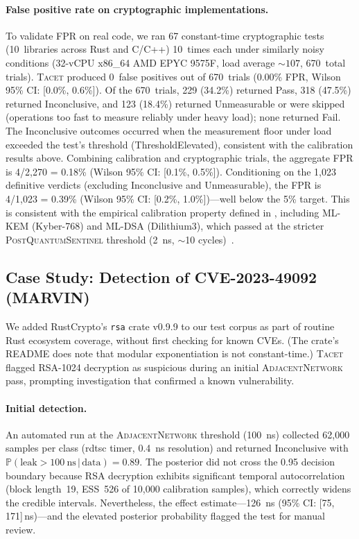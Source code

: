 \documentclass[letterpaper,twocolumn,10pt]{article}
\newcommand{\tacet}{\textsc{Tacet}\xspace}
\newcommand{\prob}[1]{\mathbb{P}(#1)}
\newcommand{\given}{\,|\,}
\newcommand{\ns}[1]{\SI{#1}{\nano\second}}
\begin{document}
\paragraph{False positive rate on cryptographic implementations.}
To validate FPR on real code, we ran 67 constant-time cryptographic tests
(10~libraries across Rust and C/C++) 10~times each under similarly noisy conditions
(32-vCPU x86\_64 AMD EPYC 9575F, load average ${\sim}107$, 670~total trials).
\tacet produced 0~false positives out of 670~trials (0.00\% FPR, Wilson 95\% CI:
[0.0\%, 0.6\%]).
Of the 670~trials, 229 (34.2\%) returned Pass, 318 (47.5\%) returned
Inconclusive, and 123 (18.4\%) returned Unmeasurable or were skipped
(operations too fast to measure reliably under heavy load); none returned Fail.
The Inconclusive outcomes occurred when the measurement floor under load exceeded
the test's threshold (ThresholdElevated), consistent with the calibration results above.
Combining calibration and cryptographic trials, the aggregate FPR is
4/2{,}270 = 0.18\% (Wilson 95\% CI: [0.1\%, 0.5\%]).
Conditioning on the 1{,}023 definitive verdicts (excluding Inconclusive and Unmeasurable),
the FPR is 4/1{,}023 = 0.39\% (Wilson 95\% CI: [0.2\%, 1.0\%])---well
below the 5\% target.
This is consistent with the empirical calibration property defined in ,
including ML-KEM (Kyber-768) and ML-DSA (Dilithium3), which passed at the stricter
\textsc{PostQuantumSentinel} threshold (\ns{2}, $\sim$10 cycles)~\cite{kyberslash}.

\subsection{Case Study: Detection of CVE-2023-49092 (MARVIN)}
\label{sec:evaluation:marvin}

We added RustCrypto's \texttt{rsa} crate v0.9.9 to our test corpus as part of
routine Rust ecosystem coverage, without first checking for known CVEs.
(The crate's README does note that modular exponentiation is not constant-time.)
\tacet flagged RSA-1024 decryption as suspicious during an initial
\textsc{AdjacentNetwork} pass, prompting investigation that confirmed a
known vulnerability.

\paragraph{Initial detection.}
An automated run at the \textsc{AdjacentNetwork} threshold (\ns{100})
collected 62{,}000 samples per class (rdtsc timer, \ns{0.4} resolution)
and returned Inconclusive with
$\prob{\text{leak} > \ns{100} \given \text{data}} = 0.89$.
The posterior did not cross the 0.95 decision boundary because RSA
decryption exhibits significant temporal autocorrelation (block
length~19, ESS~526 of 10{,}000 calibration samples), which correctly
widens the credible intervals. Nevertheless, the effect estimate---\ns{126}
(95\% CI: [75, 171]\,ns)---and the elevated posterior probability
flagged the test for manual review.
\end{document}
